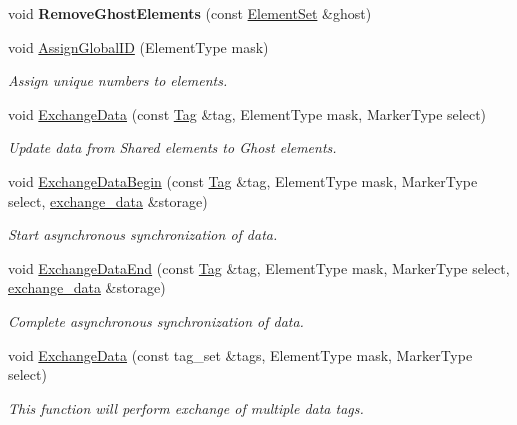 \begin{DoxyCompactItemize}
\item 
\hypertarget{classINMOST_1_1Mesh_a5c59c400e41943ea87dbb1f0eff1e2bd}{void {\bfseries Remove\-Ghost\-Elements} (const \hyperlink{classINMOST_1_1ElementSet}{Element\-Set} \&ghost)}\label{classINMOST_1_1Mesh_a5c59c400e41943ea87dbb1f0eff1e2bd}

\item 
void \hyperlink{classINMOST_1_1Mesh_ae39e30b11f35de81d2a9b8451ef87391}{Assign\-Global\-I\-D} (Element\-Type mask)
\begin{DoxyCompactList}\small\item\em Assign unique numbers to elements. \end{DoxyCompactList}\item 
void \hyperlink{classINMOST_1_1Mesh_aa3e1067bc3139bb0216f7ce3c1936734}{Exchange\-Data} (const \hyperlink{classINMOST_1_1Tag}{Tag} \&tag, Element\-Type mask, Marker\-Type select)
\begin{DoxyCompactList}\small\item\em Update data from Shared elements to Ghost elements. \end{DoxyCompactList}\item 
void \hyperlink{classINMOST_1_1Mesh_a35ca81c3d8a01aa6a9ce983769fa03cd}{Exchange\-Data\-Begin} (const \hyperlink{classINMOST_1_1Tag}{Tag} \&tag, Element\-Type mask, Marker\-Type select, \hyperlink{classINMOST_1_1Mesh_1_1exchange__data}{exchange\-\_\-data} \&storage)
\begin{DoxyCompactList}\small\item\em Start asynchronous synchronization of data. \end{DoxyCompactList}\item 
void \hyperlink{classINMOST_1_1Mesh_a443828dada7d0fe8ebcf8040593e1ac1}{Exchange\-Data\-End} (const \hyperlink{classINMOST_1_1Tag}{Tag} \&tag, Element\-Type mask, Marker\-Type select, \hyperlink{classINMOST_1_1Mesh_1_1exchange__data}{exchange\-\_\-data} \&storage)
\begin{DoxyCompactList}\small\item\em Complete asynchronous synchronization of data. \end{DoxyCompactList}\item 
void \hyperlink{classINMOST_1_1Mesh_a064ee931e0f6a75dae38a65d3e8603af}{Exchange\-Data} (const tag\-\_\-set \&tags, Element\-Type mask, Marker\-Type select)
\begin{DoxyCompactList}\small\item\em This function will perform exchange of multiple data tags. \end{DoxyCompactList}\item 

\end{DoxyCompactItemize}
